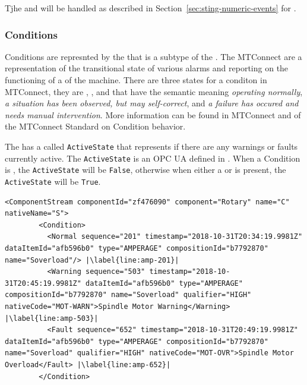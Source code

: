 Tjhe  and  will be handled as described in Section~\ref{sec:sting-numeric-events} for .

\FloatBarrier

\subsubsection{Conditions}

Conditions are represnted by the  that is a subtype of the . The MTConnect  are a representation of the transitional state of various alarms and reporting on the functioning of a  of the machine. There are three states for a conditon in MTConnect, they are , , and  that have the semantic meaning \textit{operating normally}, \textit{a situation has been observed, but may self-correct}, and \textit{a failure has occured and needs manual intervention}. More information can be found in MTConnect \cite{MTCPart2} and \cite{MTCPart3} of the MTConnect Standard on Condition behavior.

The  has a  called \texttt{ActiveState} that represents if there are any warnings or faults currently active. The \texttt{ActiveState} is an OPC UA  defined in \cite{UAPart8}. When a Condition is , the \texttt{ActiveState} will be \texttt{False}, otherwise when either a  or  is present, the \texttt{ActiveState} will be \texttt{True}.

\begin{lstlisting}[firstnumber=last,escapechar=|,%
    caption={Rotary C Component Stream},label={lst:rotary-component-stream}]
      <ComponentStream componentId="zf476090" component="Rotary" name="C" nativeName="S">
        <Condition>
          <Normal sequence="201" timestamp="2018-10-31T20:34:19.9981Z" dataItemId="afb596b0" type="AMPERAGE" compositionId="b7792870" name="Soverload"/> |\label{line:amp-201}|
          <Warning sequence="503" timestamp="2018-10-31T20:45:19.9981Z" dataItemId="afb596b0" type="AMPERAGE" compositionId="b7792870" name="Soverload" qualifier="HIGH" nativeCode="MOT-WARN">Spindle Motor Warning</Warning> |\label{line:amp-503}|
          <Fault sequence="652" timestamp="2018-10-31T20:49:19.9981Z" dataItemId="afb596b0" type="AMPERAGE" compositionId="b7792870" name="Soverload" qualifier="HIGH" nativeCode="MOT-OVR">Spindle Motor Overload</Fault> |\label{line:amp-652}|
        </Condition>
\end{lstlisting}

